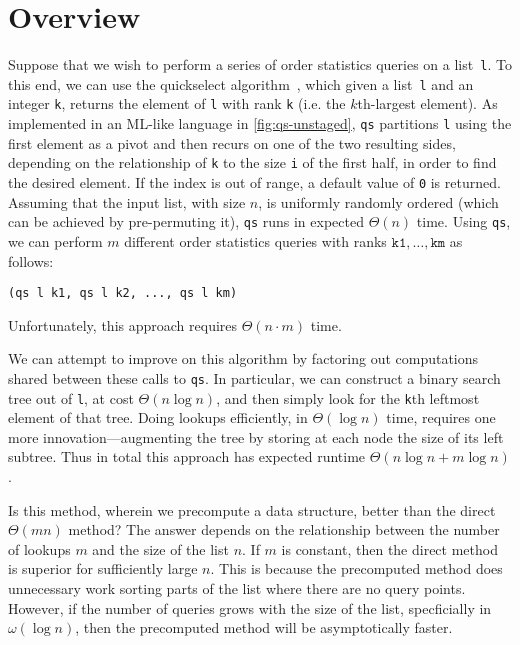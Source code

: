 
\section{Overview}
\label{sec:overview}

\begin{abstrsyn}

Suppose that we wish to perform a series of order statistics queries
on a list~\texttt{l}. To this end, we can use the quickselect
algorithm~\cite{Hoare:1961}, which given a list~\texttt{l} and an integer
\texttt{k}, returns the element of \texttt{l} with rank \texttt{k} (i.e. the $k$th-largest element).
As implemented in an ML-like language in \ref{fig:qs-unstaged},
\texttt{qs} partitions \texttt{l} using the first element as
a pivot and then recurs on one of the two resulting sides, depending on
the relationship of \texttt{k} to the size \texttt{i} of the first half, in
order to find the desired element.  
If the index is out of range, a default value of \texttt{0} is returned.
Assuming that the input list, with size $n$, is uniformly
randomly ordered (which can be achieved by pre-permuting it), \texttt{qs}
runs in expected $\Theta(n)$ time.
%
Using \texttt{qs}, we can perform $m$ different order statistics queries with
ranks $\mathtt{k1},\dots,\mathtt{km}$ as follows:
%
\begin{lstlisting}
(qs l k1, qs l k2, ..., qs l km)
\end{lstlisting}
%
Unfortunately, this approach requires $\Theta(n \cdot m)$ time.

We can attempt to improve on this algorithm by factoring out computations shared
between these calls to \texttt{qs}.
In particular, we can construct a binary search
tree out of \texttt{l}, at cost $\Theta(n\log{n})$, and then simply look for the \texttt{k}th
leftmost element of that tree. 
Doing lookups efficiently, in $\Theta(\log{n})$ time, 
requires one more innovation---augmenting the tree 
by storing at each node the size of its left subtree. 
Thus in total this approach has expected runtime $\Theta(n\log{n} + m\log{n})$.

Is this method, wherein we precompute a data structure, better than the direct $\Theta(mn)$ method? 
The answer depends on the relationship between the number of lookups $m$ and the size of the list $n$.
If $m$ is constant, then the direct method is superior for sufficiently large $n$.
This is because the precomputed method does unnecessary work 
sorting parts of the list where there are no query points.
However, if the number of queries grows with the size of the list, 
specficially in $\omega(\log n)$,
then the precomputed method will be asymptotically faster.


\end{abstrsyn}
